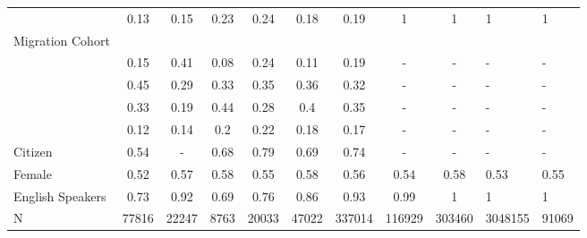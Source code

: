 \begin{table}[ht]
\begin{tabular}{>{\raggedright\arraybackslash}p{3.2cm}|cccccccc}
  & 0.13 & 0.15 & 0.23 & 0.24 & 0.18 & 0.19 & 1 & 1 & 1 & 1 \\ 
  Migration Cohort &  &  &  &  &  &  &  &  &  &  \\ 
  & 0.15 & 0.41 & 0.08 & 0.24 & 0.11 & 0.19 & - & - & - & - \\ 
  & 0.45 & 0.29 & 0.33 & 0.35 & 0.36 & 0.32 & - & - & - & - \\ 
  & 0.33 & 0.19 & 0.44 & 0.28 & 0.4 & 0.35 & - & - & - & - \\ 
  & 0.12 & 0.14 & 0.2 & 0.22 & 0.18 & 0.17 & - & - & - & - \\ 
  Citizen & 0.54 & - & 0.68 & 0.79 & 0.69 & 0.74 & - & - & - & - \\ 
  Female & 0.52 & 0.57 & 0.58 & 0.55 & 0.58 & 0.56 & 0.54 & 0.58 & 0.53 & 0.55 \\ 
  English Speakers & 0.73 & 0.92 & 0.69 & 0.76 & 0.86 & 0.93 & 0.99 & 1 & 1 & 1 \\ 
  N & 77816 & 22247 & 8763 & 20033 & 47022 & 337014 & 116929 & 303460 & 3048155 & 91069 \\ 
   \hline
\end{tabular}
\endgroup
\end{table}
